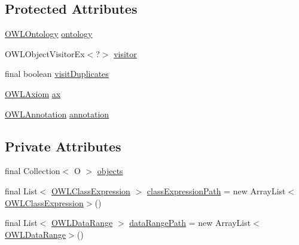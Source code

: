 \subsection*{Protected Attributes}
\begin{DoxyCompactItemize}
\item 
\hyperlink{interfaceorg_1_1semanticweb_1_1owlapi_1_1model_1_1_o_w_l_ontology}{O\-W\-L\-Ontology} \hyperlink{classorg_1_1semanticweb_1_1owlapi_1_1util_1_1_o_w_l_object_walker_3_01_o_01extends_01_o_w_l_object_01_4_aeecc325118749eb272ba8cc6ff3eef6b}{ontology}
\item 
O\-W\-L\-Object\-Visitor\-Ex$<$?$>$ \hyperlink{classorg_1_1semanticweb_1_1owlapi_1_1util_1_1_o_w_l_object_walker_3_01_o_01extends_01_o_w_l_object_01_4_a214ebac6bd31a6e3787577e0c001ab40}{visitor}
\item 
final boolean \hyperlink{classorg_1_1semanticweb_1_1owlapi_1_1util_1_1_o_w_l_object_walker_3_01_o_01extends_01_o_w_l_object_01_4_a69d7678d92a2e82b7beee825505a2f42}{visit\-Duplicates}
\item 
\hyperlink{interfaceorg_1_1semanticweb_1_1owlapi_1_1model_1_1_o_w_l_axiom}{O\-W\-L\-Axiom} \hyperlink{classorg_1_1semanticweb_1_1owlapi_1_1util_1_1_o_w_l_object_walker_3_01_o_01extends_01_o_w_l_object_01_4_ace6e77604ced63589b1f8759fabc745e}{ax}
\item 
\hyperlink{interfaceorg_1_1semanticweb_1_1owlapi_1_1model_1_1_o_w_l_annotation}{O\-W\-L\-Annotation} \hyperlink{classorg_1_1semanticweb_1_1owlapi_1_1util_1_1_o_w_l_object_walker_3_01_o_01extends_01_o_w_l_object_01_4_ac49e556faa691106b7d4761c8e6d7690}{annotation}
\end{DoxyCompactItemize}
\subsection*{Private Attributes}
\begin{DoxyCompactItemize}
\item 
final Collection$<$ O $>$ \hyperlink{classorg_1_1semanticweb_1_1owlapi_1_1util_1_1_o_w_l_object_walker_3_01_o_01extends_01_o_w_l_object_01_4_a0ed0ab47dfe25e23c03a4d2ab6e1fcae}{objects}
\item 
final List$<$ \hyperlink{interfaceorg_1_1semanticweb_1_1owlapi_1_1model_1_1_o_w_l_class_expression}{O\-W\-L\-Class\-Expression} $>$ \hyperlink{classorg_1_1semanticweb_1_1owlapi_1_1util_1_1_o_w_l_object_walker_3_01_o_01extends_01_o_w_l_object_01_4_addd026b967b2433e909d9a86f072ba35}{class\-Expression\-Path} = new Array\-List$<$\hyperlink{interfaceorg_1_1semanticweb_1_1owlapi_1_1model_1_1_o_w_l_class_expression}{O\-W\-L\-Class\-Expression}$>$()
\item 
final List$<$ \hyperlink{interfaceorg_1_1semanticweb_1_1owlapi_1_1model_1_1_o_w_l_data_range}{O\-W\-L\-Data\-Range} $>$ \hyperlink{classorg_1_1semanticweb_1_1owlapi_1_1util_1_1_o_w_l_object_walker_3_01_o_01extends_01_o_w_l_object_01_4_a3e23af59c14e179e6c7026a94377d217}{data\-Range\-Path} = new Array\-List$<$\hyperlink{interfaceorg_1_1semanticweb_1_1owlapi_1_1model_1_1_o_w_l_data_range}{O\-W\-L\-Data\-Range}$>$()
\end{DoxyCompactItemize}


